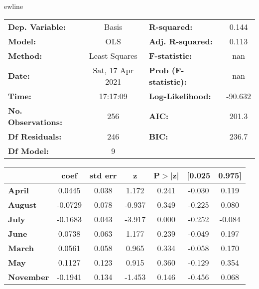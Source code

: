 ewline\begin{center}
\begin{tabular}{lclc}
\toprule
\textbf{Dep. Variable:}    &      Basis       & \textbf{  R-squared:         } &     0.144   \\
\textbf{Model:}            &       OLS        & \textbf{  Adj. R-squared:    } &     0.113   \\
\textbf{Method:}           &  Least Squares   & \textbf{  F-statistic:       } &       nan   \\
\textbf{Date:}             & Sat, 17 Apr 2021 & \textbf{  Prob (F-statistic):} &      nan    \\
\textbf{Time:}             &     17:17:09     & \textbf{  Log-Likelihood:    } &   -90.632   \\
\textbf{No. Observations:} &         256      & \textbf{  AIC:               } &     201.3   \\
\textbf{Df Residuals:}     &         246      & \textbf{  BIC:               } &     236.7   \\
\textbf{Df Model:}         &           9      & \textbf{                     } &             \\
\bottomrule
\end{tabular}
\begin{tabular}{lcccccc}
                   & \textbf{coef} & \textbf{std err} & \textbf{z} & \textbf{P$> |$z$|$} & \textbf{[0.025} & \textbf{0.975]}  \\
\midrule
\textbf{April}     &       0.0445  &        0.038     &     1.172  &         0.241        &       -0.030    &        0.119     \\
\textbf{August}    &      -0.0729  &        0.078     &    -0.937  &         0.349        &       -0.225    &        0.080     \\
\textbf{July}      &      -0.1683  &        0.043     &    -3.917  &         0.000        &       -0.252    &       -0.084     \\
\textbf{June}      &       0.0738  &        0.063     &     1.177  &         0.239        &       -0.049    &        0.197     \\
\textbf{March}     &       0.0561  &        0.058     &     0.965  &         0.334        &       -0.058    &        0.170     \\
\textbf{May}       &       0.1127  &        0.123     &     0.915  &         0.360        &       -0.129    &        0.354     \\
\textbf{November}  &      -0.1941  &        0.134     &    -1.453  &         0.146        &       -0.456    &        0.068     \\

\end{tabular}
\end{center}
